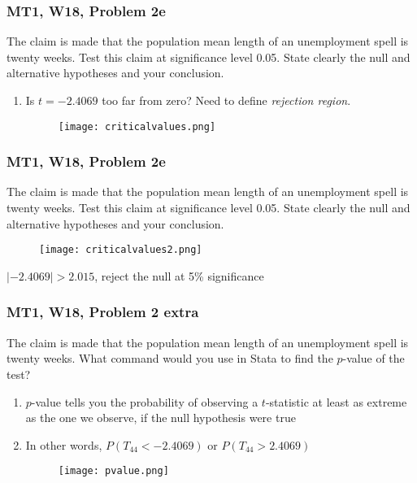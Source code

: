 \documentclass[handout, 9pt]{beamer}
\begin{document}
\begin{frame}
	\frametitle{MT1, W18, Problem 2e}
	The claim is made that the population mean length of an unemployment spell is twenty weeks. Test this claim at significance level 0.05. State clearly the null and alternative hypotheses and your conclusion.
	
	\begin{enumerate}
		\item Is $t = -2.4069$ too far from zero? Need to define \emph{rejection region}.
		\begin{figure}[H]\centering
			\texttt{[image: criticalvalues.png]}
		\end{figure}

	\end{enumerate}
\end{frame}







\begin{frame}
	\frametitle{MT1, W18, Problem 2e}
	The claim is made that the population mean length of an unemployment spell is twenty weeks. Test this claim at significance level 0.05. State clearly the null and alternative hypotheses and your conclusion.
	
		\begin{figure}[H]\centering
				\texttt{[image: criticalvalues2.png]}
		\end{figure}
$|-2.4069| > 2.015$, reject the null at 5\% significance

\end{frame}




\begin{frame}
	\frametitle{MT1, W18, Problem 2 extra}
	The claim is made that the population mean length of an unemployment spell is twenty weeks. What command would you use in Stata to find the $p$-value of the test?
	
	\begin{enumerate}
		\item<2-> $p$-value tells you the probability of observing a $t$-statistic at least as extreme as the one we observe, if the null hypothesis were true
		\item<3-> In other words, $P(T_{44} < -2.4069)$ or $P(T_{44} > 2.4069)$
		\begin{figure}[H]\centering
				\texttt{[image: pvalue.png]}
		\end{figure}
	\end{enumerate}
\end{frame}
\end{document}
